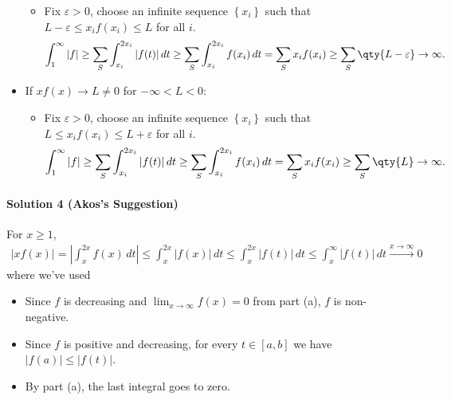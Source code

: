 \begin{solution}
\begin{itemize}
  \begin{itemize}
  \tightlist
  \item
    Fix \(\varepsilon> 0\), choose an infinite sequence
    \(\left\{{x_i}\right\}\) such that
    \(L-\varepsilon\leq x_i f(x_i) \leq L\) for all \(i\).
    \begin{align*}
    \int_1^\infty {\left\lvert {f} \right\rvert} \geq \sum_S \int_{x_i}^{2x_i} {\left\lvert {f(t)} \right\rvert}\,dt \geq \sum_S \int_{x_i}^{2x_i} f(x_i) \,dt = \sum_S x_i f(x_i) \geq \sum_S \qty{L-\varepsilon} \to \infty
    .\end{align*}
  \end{itemize}
\item
  If \(xf(x) \to L \neq 0\) for \(-\infty < L < 0\):

  \begin{itemize}
  \tightlist
  \item
    Fix \(\varepsilon> 0\), choose an infinite sequence
    \(\left\{{x_i}\right\}\) such that
    \(L \leq x_i f(x_i) \leq L + \varepsilon\) for all \(i\).
    \begin{align*}
    \int_1^\infty {\left\lvert {f} \right\rvert} \geq \sum_S \int_{x_i}^{2x_i} {\left\lvert {f(t)} \right\rvert}\,dt \geq \sum_S \int_{x_i}^{2x_i} f(x_i) \,dt = \sum_S x_i f(x_i) \geq \sum_S \qty{L} \to \infty
    .\end{align*}
  \end{itemize}
\end{itemize}

\hypertarget{solution-4-akoss-suggestion}{%
\paragraph{Solution 4 (Akos's
Suggestion)}\label{solution-4-akoss-suggestion}}

For \(x\geq 1\),
\begin{align*}
{\left\lvert {xf(x)} \right\rvert} = {\left\lvert { \int_x^{2x} f(x) \, dt } \right\rvert} \leq \int_x^{2x} {\left\lvert {f(x)} \right\rvert} \, dt \leq \int_x^{2x} {\left\lvert {f(t)} \right\rvert}\, dt \leq \int_x^{\infty} {\left\lvert {f(t)} \right\rvert} \,dt \overset{x\to\infty}\to 0
\end{align*}
where we've used

\begin{itemize}
\tightlist
\item
  Since \(f\) is decreasing and \(\lim_{x\to\infty}f(x) =0\) from part
  (a), \(f\) is non-negative.
\item
  Since \(f\) is positive and decreasing, for every \(t\in[a, b]\) we
  have
  \({\left\lvert {f(a)} \right\rvert} \leq {\left\lvert {f(t)} \right\rvert}\).
\item
  By part (a), the last integral goes to zero.
\end{itemize}


\end{solution}
